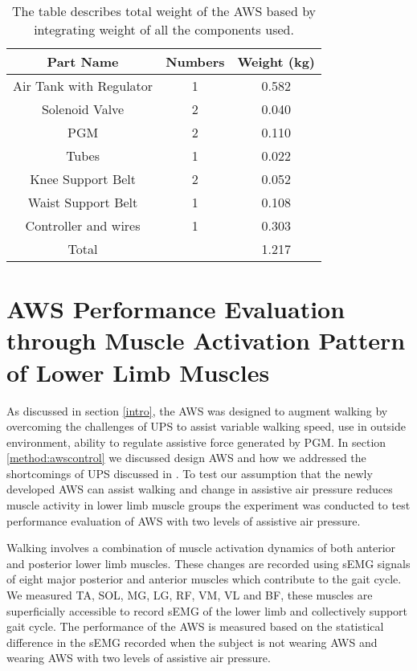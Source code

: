 \documentclass[letterpaper, 10 pt, conference]{ieeeconf}  %
\begin{document}
\begin{table}[]
	\centering
	\caption{The table describes total weight of the AWS based by integrating weight of all the components used.}
	\label{awsweight}
	\begin{tabular}{@{}ccc@{}}
		\toprule
		\textbf{Part Name}      & \textbf{Numbers} & \textbf{Weight (kg)} \\ \midrule
		Air Tank with Regulator & 1                & 0.582                  \\
		Solenoid Valve          & 2                & 0.040                   \\
		PGM                     & 2                & 0.110                  \\
		Tubes                   & 1                & 0.022                   \\
		Knee Support Belt       & 2                & 0.052                   \\
		Waist Support Belt      & 1                & 0.108                  \\
		Controller and wires    & 1                & 0.303                  \\ \midrule
		Total                   &                  & 1.217                 \\ \bottomrule
	\end{tabular}
\end{table}

\section{AWS Performance Evaluation through Muscle Activation Pattern of Lower Limb Muscles} \label{Evaluation}

As discussed in section \ref{intro}, the AWS was designed to augment walking by overcoming the challenges of UPS to assist variable walking speed, use in outside environment, ability to regulate assistive force generated by PGM. In section \ref{method:awscontrol} we discussed design AWS and how we addressed the shortcomings of UPS discussed in \cite{14}. To test our assumption that the newly developed AWS can assist walking and change in assistive air pressure reduces muscle activity in lower limb muscle groups the experiment was conducted to test performance evaluation of AWS with two levels of assistive air pressure. 

Walking involves a combination of muscle activation dynamics of both anterior and posterior lower limb muscles. These changes are recorded using sEMG signals of eight major posterior and anterior muscles which contribute to the gait cycle. We measured TA, SOL, MG, LG, RF, VM, VL and BF, these muscles are superficially accessible to record sEMG of the lower limb and collectively support gait cycle. The performance of the AWS is measured based on the statistical difference in the sEMG recorded when the subject is not wearing AWS and wearing AWS with two levels of assistive air pressure.
\end{document}
